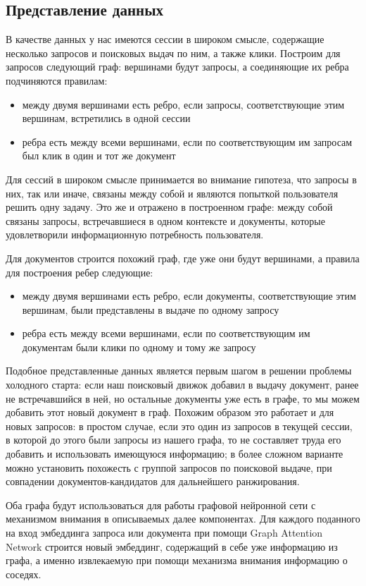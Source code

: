\documentclass[diploma]{nanolab2015}
\begin{document}
\subsection{Представление данных}
В качестве данных у нас имеются сессии в широком смысле, содержащие несколько запросов и поисковых выдач по ним, а также клики. Построим для запросов следующий граф: вершинами будут запросы, а соединяющие их ребра подчиняются правилам:
\begin{itemize}
    \item между двумя вершинами есть ребро, если запросы, соответствующие этим вершинам, встретились в одной сессии
    \item ребра есть между всеми вершинами, если по соответствующим им запросам был клик в один и тот же документ
\end{itemize}

Для сессий в широком смысле принимается во внимание гипотеза, что запросы в них, так или иначе, связаны между собой и являются попыткой пользователя решить одну задачу. Это же и отражено в построенном графе: между собой связаны запросы, встречавшиеся в одном контексте и документы, которые удовлетворили информационную потребность пользователя.

Для документов строится похожий граф, где уже они будут вершинами, а правила для построения ребер следующие:
\begin{itemize}
    \item между двумя вершинами есть ребро, если документы, соответствующие этим вершинам, были представлены в выдаче по одному запросу
    \item ребра есть между всеми вершинами, если по соответствующим им документам были клики по одному и тому же запросу
\end{itemize}

Подобное представленные данных является первым шагом в решении проблемы холодного старта: если наш поисковый движок добавил в выдачу документ, ранее не встречавшийся в ней, но остальные документы уже есть в графе, то мы можем добавить этот новый документ в граф. Похожим образом это работает и для новых запросов: в простом случае, если это один из запросов в текущей сессии, в которой до этого были запросы из нашего графа, то не составляет труда его добавить и использовать имеющуюся информацию; в более сложном варианте можно установить похожесть с группой запросов по поисковой выдаче, при совпадении документов-кандидатов для дальнейшего ранжирования.

Оба графа будут использоваться для работы графовой нейронной сети с механизмом внимания \cite{GAT} в описываемых далее компонентах. Для каждого поданного на вход эмбеддинга запроса или документа при помощи Graph Attention Network строится новый эмбеддинг, содержащий в себе уже информацию из графа, а именно извлекаемую при помощи механизма внимания \cite{Attention} информацию о соседях.
\end{document}
